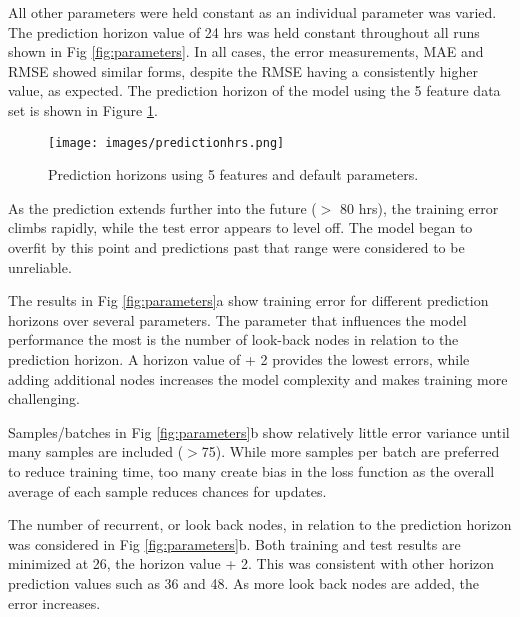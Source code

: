 \begin{linenumbers}
%
All other parameters were held constant as an individual parameter was varied. The prediction horizon value of 24 hrs was held constant throughout all runs shown in  Fig \ref{fig:parameters}. In all cases, the error measurements, MAE and RMSE showed similar forms, despite the RMSE having a consistently higher value, as expected. The prediction horizon of the model using the 5 feature data set is shown in Figure \ref{fig:predictionhrs}.

%
\begin{figure}[!htb]
\centering
\texttt{[image: images/predictionhrs.png]}
\caption{Prediction horizons using 5 features and default parameters.}
\label{fig:predictionhrs}
\end{figure}
%
As the prediction extends further into the future ($>$ 80 hrs), the training error climbs rapidly, while the test error appears to level off. The model began to overfit by this point and predictions past that range were considered to be unreliable.

The results in  Fig \ref{fig:parameters}a show training error for different prediction horizons over several parameters. The parameter that influences the model performance the most is the number of look-back nodes in relation to the prediction horizon. A horizon value of + 2 provides the lowest errors, while adding additional nodes increases the model complexity and makes training more challenging. 

Samples/batches in Fig \ref{fig:parameters}b show relatively little error variance until many samples are included ($>$75). While more samples per batch are preferred to reduce training time, too many create bias in the loss function as the overall average of each sample reduces chances for updates.

The number of recurrent, or look back nodes, in relation to the prediction horizon was considered in  Fig \ref{fig:parameters}b. Both training and test results are minimized at 26, the horizon value + 2. This was consistent with other horizon prediction values such as 36 and 48. As more look back nodes are added, the error increases.


\end{linenumbers}
